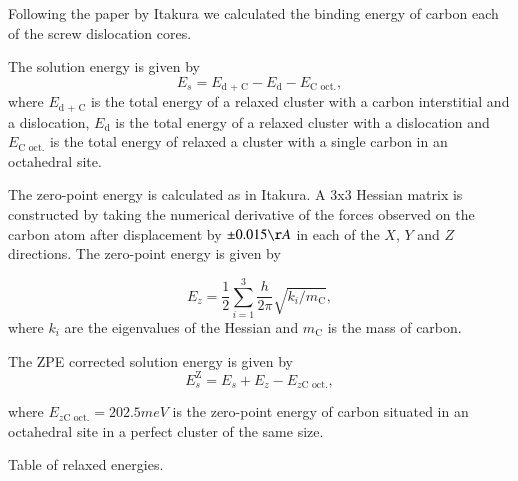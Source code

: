 \documentclass[a4paper]{apa6}
\begin{document}
Following the paper by Itakura
\cite{itakura13_effec_hydrog_atoms_screw_disloc} we calculated the
binding energy of carbon each of the screw dislocation cores. 

The solution energy is given by 
\[ E_s = E_{\text{d + C}} - E_{\text{d}} - E_{\text{C oct.}}, \]
where \(E_{\text{d + C}}\) is the total energy of a relaxed cluster with a
carbon interstitial and a dislocation, \(E_{\text{d}}\) is the total
energy of a relaxed cluster with a dislocation and \(E_{\text{C
    oct.}}\) is the total energy of relaxed a cluster with a single carbon in
an octahedral site.

The zero-point energy is calculated as in Itakura. A 3x3 Hessian
matrix is constructed by taking the numerical derivative of the
forces observed on the carbon atom after displacement by \(\pm 0.015 \AA\) in each of the \(X\), \(Y\) and \(Z\)
directions. The zero-point energy is given by

\[ E_z = \frac{1}{2} \sum_{i=1}^3 \frac{h}{2\pi} \sqrt{ k_i /
    m_{\text{C}} },  \]
where \(k_i\) are the eigenvalues of the Hessian and \(m_\text{C}\) is
the mass of carbon. 

The ZPE corrected solution energy is given by 
\[ E^{\text{Z}}_{s} = E_s + E_z - E_{z\text{C oct.}},  \]

where \(E_{z\text{C oct.}} = 202.5 meV\) is the zero-point energy of carbon
situated in an octahedral site in a perfect cluster of the same size. 

Table of relaxed energies.  
\end{document}
